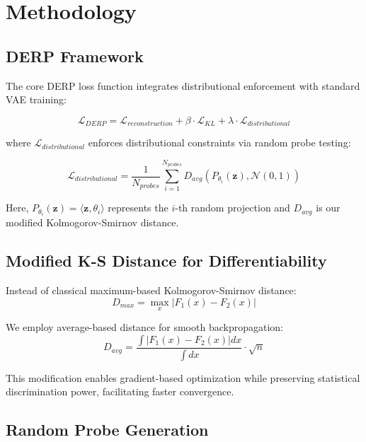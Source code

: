 \documentclass[11pt]{article}
\begin{document}
\section{Methodology}

\subsection{DERP Framework}

The core DERP loss function integrates distributional enforcement with standard VAE training:

\begin{equation}
\mathcal{L}_{DERP} = \mathcal{L}_{reconstruction} + \beta \cdot \mathcal{L}_{KL} + \lambda \cdot \mathcal{L}_{distributional}
\end{equation}

where $\mathcal{L}_{distributional}$ enforces distributional constraints via random probe testing:

\begin{equation}
\mathcal{L}_{distributional} = \frac{1}{N_{probes}} \sum_{i=1}^{N_{probes}} D_{avg}(P_{\theta_i}(\mathbf{z}), \mathcal{N}(0,1))
\end{equation}

Here, $P_{\theta_i}(\mathbf{z}) = \langle \mathbf{z}, \theta_i \rangle$ represents the $i$-th random projection and $D_{avg}$ is our modified Kolmogorov-Smirnov distance.

\subsection{Modified K-S Distance for Differentiability}

Instead of classical maximum-based Kolmogorov-Smirnov distance:
\begin{equation}
D_{max} = \max_x |F_1(x) - F_2(x)|
\end{equation}

We employ average-based distance for smooth backpropagation:
\begin{equation}
D_{avg} = \frac{\int |F_1(x) - F_2(x)| dx}{\int dx} \cdot \sqrt{n}
\end{equation}

This modification enables gradient-based optimization while preserving statistical discrimination power, facilitating faster convergence.

\subsection{Random Probe Generation}
\end{document}
